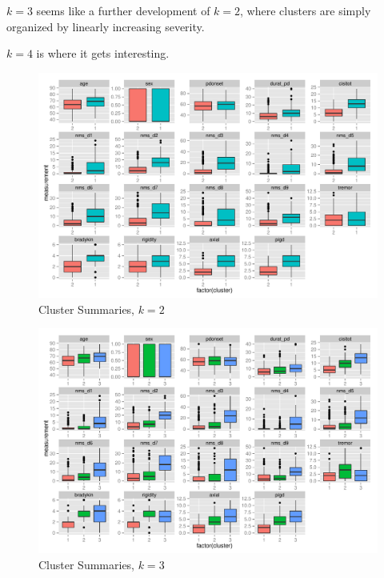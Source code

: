 \documentclass[letterpaper,12pt]{article}
\begin{document}
$k = 3$ seems like a further development of $k = 2$, where clusters are simply
organized by linearly increasing severity.

$k = 4$ is where it gets interesting.

\begin{figure}[h]
  \centering
  \includegraphics[width=\linewidth]{kmeans-summaries-2.pdf}
  \caption{Cluster Summaries, $k = 2$}
  \label{fig:kmeans-summaries-2}
\end{figure}

\begin{figure}[h]
  \centering
  \includegraphics[width=\linewidth]{kmeans-summaries-3.pdf}
  \caption{Cluster Summaries, $k = 3$}
  \label{fig:kmeans-summaries-3}
\end{figure}
\end{document}
